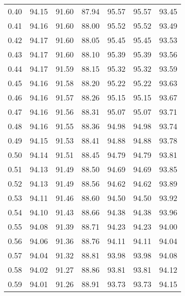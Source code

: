 \begin{tabular}{|c|c|c|c|c|c|c|}
      0.40 &     94.15 &     91.60 &      87.94 &   95.57 &      95.57 &         93.45 \\
      0.41 &     94.16 &     91.60 &      88.00 &   95.52 &      95.52 &         93.49 \\
      0.42 &     94.17 &     91.60 &      88.05 &   95.45 &      95.45 &         93.53 \\
      0.43 &     94.17 &     91.60 &      88.10 &   95.39 &      95.39 &         93.56 \\
      0.44 &     94.17 &     91.59 &      88.15 &   95.32 &      95.32 &         93.59 \\
      0.45 &     94.16 &     91.58 &      88.20 &   95.22 &      95.22 &         93.63 \\
      0.46 &     94.16 &     91.57 &      88.26 &   95.15 &      95.15 &         93.67 \\
      0.47 &     94.16 &     91.56 &      88.31 &   95.07 &      95.07 &         93.71 \\
      0.48 &     94.16 &     91.55 &      88.36 &   94.98 &      94.98 &         93.74 \\
      0.49 &     94.15 &     91.53 &      88.41 &   94.88 &      94.88 &         93.78 \\
      0.50 &     94.14 &     91.51 &      88.45 &   94.79 &      94.79 &         93.81 \\
      0.51 &     94.13 &     91.49 &      88.50 &   94.69 &      94.69 &         93.85 \\
      0.52 &     94.13 &     91.49 &      88.56 &   94.62 &      94.62 &         93.89 \\
      0.53 &     94.11 &     91.46 &      88.60 &   94.50 &      94.50 &         93.92 \\
      0.54 &     94.10 &     91.43 &      88.66 &   94.38 &      94.38 &         93.96 \\
      0.55 &     94.08 &     91.39 &      88.71 &   94.23 &      94.23 &         94.00 \\
      0.56 &     94.06 &     91.36 &      88.76 &   94.11 &      94.11 &         94.04 \\
      0.57 &     94.04 &     91.32 &      88.81 &   93.98 &      93.98 &         94.08 \\
      0.58 &     94.02 &     91.27 &      88.86 &   93.81 &      93.81 &         94.12 \\
      0.59 &     94.01 &     91.26 &      88.91 &   93.73 &      93.73 &         94.15 \\

\end{tabular}
